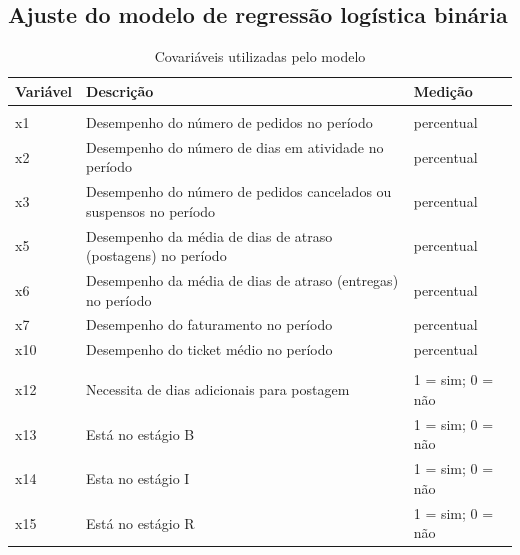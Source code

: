 \documentclass[twocolumn]{rbef}
\newcommand{\1}{\mathbbm{1}}
\begin{document}
\hypertarget{ajuste-do-modelo-de-regressuxe3o-loguxedstica-binuxe1ria}{%
\subsection{Ajuste do modelo de regressão logística binária}\label{ajuste-do-modelo-de-regressuxe3o-loguxedstica-binuxe1ria}}

\begin{table}

\caption{\label{tab:covars}Covariáveis utilizadas pelo modelo}
\centering
\fontsize{10}{12}\selectfont
\begin{tabular}[t]{lll}
\toprule
Variável & Descrição & Medição\\
\midrule
\addlinespace[0.3em]
\multicolumn{3}{l}{\textbf{Métricas de desempenho}}\\
\hspace{1em}x1 & Desempenho do número de pedidos no período & percentual\\
\hspace{1em}x2 & Desempenho do número de dias em atividade no período & percentual\\
\hspace{1em}x3 & Desempenho do número de pedidos cancelados ou suspensos no período & percentual\\
\hspace{1em}x5 & Desempenho da média de dias de atraso (postagens) no período & percentual\\
\hspace{1em}x6 & Desempenho da média de dias de atraso (entregas) no período & percentual\\
\hspace{1em}x7 & Desempenho do faturamento no período & percentual\\
\hspace{1em}x10 & Desempenho do ticket médio no período & percentual\\
\addlinespace[0.3em]
\multicolumn{3}{l}{\textbf{Qualitativas}}\\
\hspace{1em}x12 & Necessita de dias adicionais para postagem & 1 = sim; 0 = não\\
\hspace{1em}x13 & Está no estágio B & 1 = sim; 0 = não\\
\hspace{1em}x14 & Esta no estágio I & 1 = sim; 0 = não\\
\hspace{1em}x15 & Está no estágio R & 1 = sim; 0 = não\\

\end{tabular}
\end{table}
\end{document}
